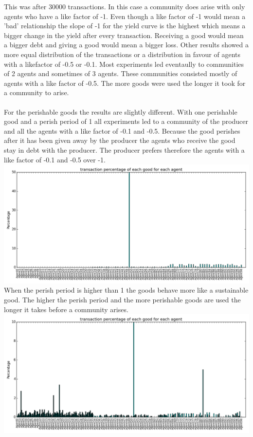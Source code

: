 \documentclass[twoside,openright]{uva-bachelor-thesis}
\begin{document}
This was after 30000 transactions. In this case a community does arise with only agents who have a like factor of -1. Even though a like factor of -1 would mean a 'bad' relationship the slope of -1 for the yield curve is the highest which means a bigger change in the yield after every transaction. Receiving a good would mean a bigger debt and giving a good would mean a bigger loss.
Other results showed a more equal distribution of the transactions or a distribution in favour of agents with a likefactor of -0.5 or -0.1. Most experiments led eventaully to communities of 2 agents and sometimes of 3 agents. These communities consisted mostly of agents with a like factor of -0.5. The more goods were used the longer it took for a community to arise. \\
\\
For the perishable goods the results are slightly different. With one perishable good and a perish period of 1 all experiments led to a community of the producer and all the agents with a like factor of -0.1 and -0.5. Because the good perishes after it has been given away by the producer the agents who receive the good stay in debt with the producer. The producer prefers therefore the agents with a like factor of -0.1 and -0.5 over -1. \\
\includegraphics[scale=0.4]{GR_L1B2N1/1000transactions1perishable1-1}
When the perish period is higher than 1 the goods behave more like a sustainable good. The higher the perish period and the more perishable goods are used the longer it takes before a community arises.\\
\includegraphics[scale=0.4]{GR_L1B2N1/1000transactions5perishable}
\end{document}
